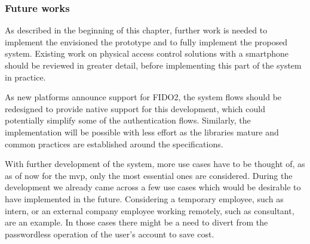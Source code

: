 \subsubsection*{Future works}
As described in the beginning of this chapter, further work is needed to implement the envisioned the prototype and to fully implement the proposed system. Existing work on physical access control solutions with a smartphone should be reviewed in greater detail, before implementing this part of the system in practice. 

As new platforms announce support for FIDO2, the system flows should be redesigned to provide native support for this development, which could potentially simplify some of the authentication flows. Similarly, the implementation will be possible with less effort as the libraries mature and common practices are established around the specifications.

With further development of the system, more use cases have to be thought of, as as of now for the \acrshort{mvp}, only the most essential ones are considered. During the development we already came across a few use cases which would be desirable to have implemented in the future. Considering a temporary employee, such as intern, or an external company employee working remotely, such as consultant, are an example. In those cases there might be a need to divert from the passwordless operation of the user's account to save cost. 